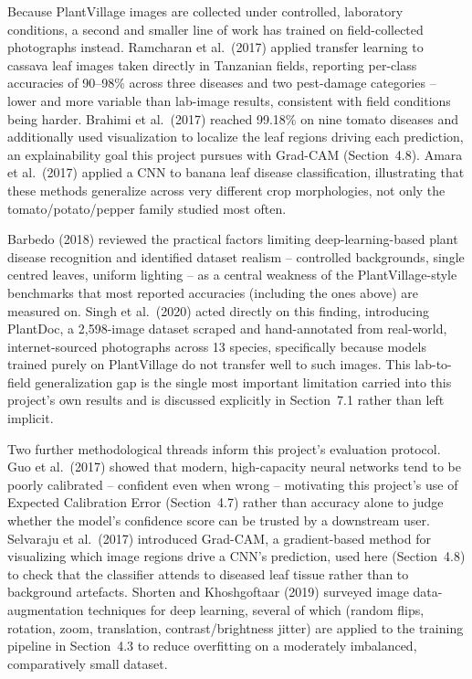 \documentclass[12pt,a4paper]{article}
\begin{document}
Because PlantVillage images are collected under controlled, laboratory
conditions, a second and smaller line of work has trained on field-collected
photographs instead. Ramcharan et al.\ (2017) \cite{ramcharan2017} applied
transfer learning to cassava leaf images taken directly in Tanzanian fields,
reporting per-class accuracies of 90--98\% across three diseases and two
pest-damage categories -- lower and more variable than lab-image results,
consistent with field conditions being harder. Brahimi et al.\ (2017)
\cite{brahimi2017} reached 99.18\% on nine tomato diseases and additionally
used visualization to localize the leaf regions driving each prediction, an
explainability goal this project pursues with Grad-CAM (Section~4.8). Amara
et al.\ (2017) \cite{amara2017} applied a CNN to banana leaf disease
classification, illustrating that these methods generalize across very
different crop morphologies, not only the tomato/potato/pepper family
studied most often.

Barbedo (2018) \cite{barbedo2018} reviewed the practical factors limiting
deep-learning-based plant disease recognition and identified dataset
realism -- controlled backgrounds, single centred leaves, uniform lighting --
as a central weakness of the PlantVillage-style benchmarks that most reported
accuracies (including the ones above) are measured on. Singh et al.\ (2020)
\cite{singh2020plantdoc} acted directly on this finding, introducing
PlantDoc, a 2{,}598-image dataset scraped and hand-annotated from real-world,
internet-sourced photographs across 13 species, specifically because models
trained purely on PlantVillage do not transfer well to such images. This
lab-to-field generalization gap is the single most important limitation
carried into this project's own results and is discussed explicitly in
Section~7.1 rather than left implicit.

Two further methodological threads inform this project's evaluation
protocol. Guo et al.\ (2017) \cite{guo2017calibration} showed that modern,
high-capacity neural networks tend to be poorly calibrated -- confident even
when wrong -- motivating this project's use of Expected Calibration Error
(Section~4.7) rather than accuracy alone to judge whether the model's
confidence score can be trusted by a downstream user. Selvaraju et al.\
(2017) \cite{selvaraju2017gradcam} introduced Grad-CAM, a gradient-based
method for visualizing which image regions drive a CNN's prediction, used
here (Section~4.8) to check that the classifier attends to diseased leaf
tissue rather than to background artefacts. Shorten and Khoshgoftaar (2019)
\cite{shorten2019augmentation} surveyed image data-augmentation techniques
for deep learning, several of which (random flips, rotation, zoom,
translation, contrast/brightness jitter) are applied to the training pipeline
in Section~4.3 to reduce overfitting on a moderately imbalanced,
comparatively small dataset.
\end{document}
